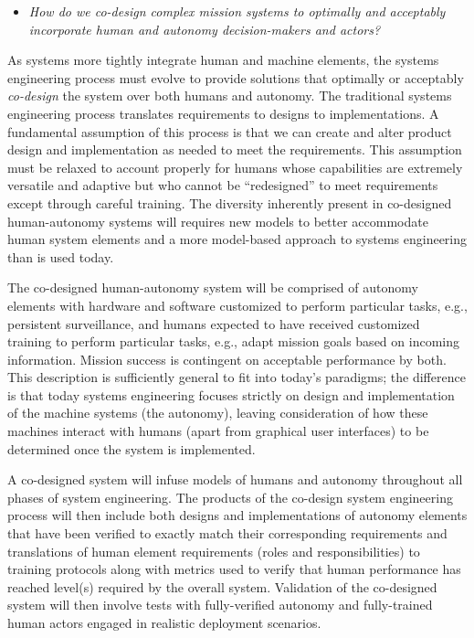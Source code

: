 \begin{itemize}
\item {\em How do we co-design complex mission systems to optimally and acceptably incorporate human and autonomy decision-makers and actors?}
\end{itemize}


As systems more tightly integrate human and machine elements, the systems engineering process must evolve
to provide solutions that optimally or acceptably {\em{co-design}} the system over both humans and autonomy.
The traditional systems engineering process translates requirements to designs to implementations.  A fundamental
assumption of this process is that we can create and alter product design and implementation as needed to meet the requirements.
This assumption must be relaxed to account properly for humans whose capabilities are extremely versatile and adaptive but who cannot be 
``redesigned'' to meet requirements except through careful training.  The diversity inherently present in co-designed 
human-autonomy systems will requires new models to better accommodate human system elements and a more model-based approach to systems engineering than is used today.  

The co-designed human-autonomy system will be comprised of autonomy elements with
hardware and software customized to perform particular tasks, e.g., persistent surveillance, 
and humans expected to have received customized training to perform particular tasks, 
e.g., adapt mission goals based on incoming information.  Mission success is contingent on acceptable performance
by both.  This description is sufficiently general to fit into today's paradigms; the difference is that today
systems engineering focuses strictly on design and implementation of the machine systems (the autonomy), leaving
consideration of how these machines interact with humans (apart from graphical user interfaces) 
to be determined once the system is implemented. 

A co-designed system will infuse models of humans and autonomy throughout all phases of system engineering.
The products of the co-design system engineering process will then include both designs and implementations of autonomy 
elements that have been verified to exactly match their corresponding requirements and translations 
of human element requirements (roles and responsibilities) to training protocols along with metrics
used to verify that human performance has reached level(s) required by the overall system.  Validation of the 
co-designed system will then involve tests with fully-verified autonomy and fully-trained human actors engaged in
realistic deployment scenarios.

